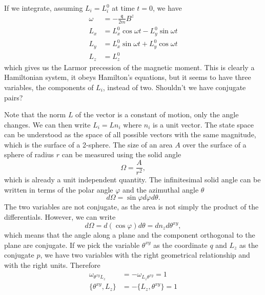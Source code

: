 If we integrate, assuming $L_i = L^0_i$ at time $t=0$, we have
\begin{equation}
	\begin{aligned}
		\omega &= - \frac{\mathfrak{q}}{2m} B^z \\
		L_x & = L_x^0 \cos \omega t - L_y^0 \sin \omega t \\
		L_y & = L_x^0 \sin \omega t + L_y^0 \cos \omega t \\
		L_z &= L_z^0
	\end{aligned}
\end{equation}
which gives us the Larmor precession of the magnetic moment. This is clearly a Hamiltonian system, it obeys Hamilton's equations, but it seems to have three variables, the components of $L_i$, instead of two. Shouldn't we have conjugate pairs?

Note that the norm $L$ of the vector is a constant of motion, only the angle changes. We can then write $L_i = L n_i$ where $n_i$ is a unit vector. The state space can be understood as the space of all possible vectors with the same magnitude, which is the surface of a 2-sphere. The size of an area $A$ over the surface of a sphere of radius $r$ can be measured using the solid angle
\begin{equation}
	\Omega = \frac{A}{r^2},
\end{equation}
which is already a unit independent quantity. The infinitesimal solid angle can be written in terms of the polar angle $\varphi$ and the azimuthal angle $\theta$
\begin{equation}
	d\Omega = \sin \varphi d\varphi d\theta.
\end{equation}
The two variables are not conjugate, as the area is not simply the product of the differentials. However, we can write
\begin{equation}
	d\Omega = d(\cos \varphi) d\theta = dn_z d\theta^{xy},
\end{equation}
which means that the angle along a plane and the component orthogonal to the plane are conjugate. If we pick the variable $\theta^{xy}$ as the coordinate $q$ and $L_z$ as the conjugate $p$, we have two variables with the right geometrical relationship and with the right units. Therefore
\begin{equation}
	\begin{aligned}
		\omega_{\theta^{xy}L_z} &= - \omega_{L_z\theta^{xy}} = 1 \\
		\{\theta^{xy}, L_z \} &= - \{L_z, \theta^{xy}\} = 1
	\end{aligned}
\end{equation}

